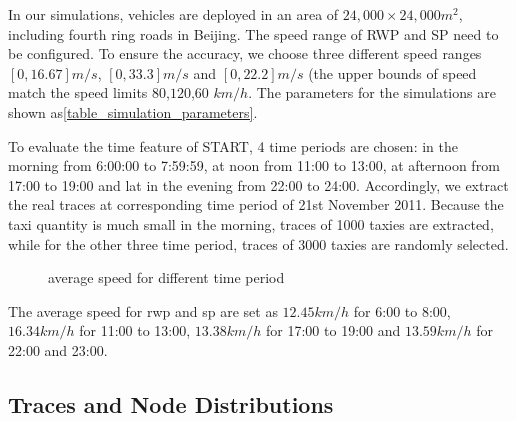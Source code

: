 In our simulations, vehicles are deployed in an area of $24,000\times 24,000 m^2$, including fourth ring roads in Beijing. The speed range of RWP and SP need to be configured.
To ensure the accuracy, we choose three different speed ranges $[0,16.67]m/s$, $[0,33.3]m/s$ and $[0,22.2]m/s$ (the upper bounds of speed match the speed limits $80$,$120$,$60$ $km/h$. The parameters for the simulations are shown as\ref{table_simulation_parameters}.

To evaluate the time feature of START, 4 time periods are chosen: in the morning from 6:00:00 to 7:59:59, at noon from 11:00 to 13:00, at afternoon from 17:00 to 19:00 and lat in the evening from 22:00 to 24:00. Accordingly, we extract the real traces at corresponding time period of 21st November 2011. Because the taxi quantity is much small in the morning, traces of 1000 taxies are extracted, while for the other three time period, traces of 3000 taxies are randomly selected. 

\begin{figure}
\centering
\epsfysize=2in
\caption{average speed for different time period}
\end{figure}


The average speed for rwp and sp are set as $12.45 km/h$ for 6:00 to 8:00, $16.34km/h$ for 11:00 to 13:00, $13.38km/h$ for 17:00 to 19:00 and $13.59 km/h$ for 22:00 and 23:00.
\subsection{Traces and Node Distributions}

